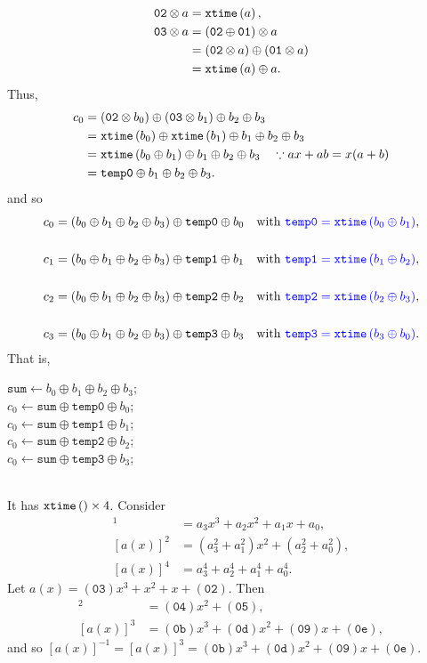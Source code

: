 \begin{align*}
	\texttt{02}\otimes a&=\texttt{xtime}\left(a\right), \\
	\texttt{03}\otimes a&=(\texttt{02}\oplus \texttt{01})\otimes a\\
	&=(\texttt{02}\otimes a)\oplus(\texttt{01}\otimes a) \\
	&=\texttt{xtime}\left(a\right)\oplus a.
\end{align*} Thus, \begin{align*}
c_0&=(\texttt{02}\otimes b_0)\oplus(\texttt{03}\otimes b_1)\oplus b_2\oplus b_3\\
&=\texttt{xtime}\left(b_0\right)\oplus\texttt{xtime}\left(b_1\right)\oplus b_1\oplus b_2\oplus b_3 \\
&=\texttt{xtime}\left(b_0\oplus b_1\right)\oplus b_1\oplus b_2\oplus b_3\quad\because ax+ab=x(a+b) \\
&=\texttt{temp0}\oplus b_1\oplus b_2\oplus b_3.
\end{align*} and so \begin{align*}
c_0&=(b_0\oplus b_1\oplus b_2\oplus b_3)\oplus\texttt{temp0}\oplus b_0 &\text{with}\ \textcolor{blue}{\texttt{temp0} = \texttt{xtime}\left(b_0\oplus b_1\right)},\\ \\
c_1&=(b_0\oplus b_1\oplus b_2\oplus b_3)\oplus\texttt{temp1}\oplus b_1 &\text{with}\ \textcolor{blue}{\texttt{temp1} = \texttt{xtime}\left(b_1\oplus b_2\right)},\\ \\
c_2&=(b_0\oplus b_1\oplus b_2\oplus b_3)\oplus\texttt{temp2}\oplus b_2 &\text{with}\ \textcolor{blue}{\texttt{temp2} = \texttt{xtime}\left(b_2\oplus b_3\right)},\\ \\
c_3&=(b_0\oplus b_1\oplus b_2\oplus b_3)\oplus\texttt{temp3}\oplus b_3 &\text{with}\ \textcolor{blue}{\texttt{temp3} = \texttt{xtime}\left(b_3\oplus b_0\right)}.
\end{align*} That is, \begin{algorithm}
$\texttt{sum}\gets b_0\oplus b_1\oplus b_2\oplus b_3$; \\
$c_0\gets\texttt{sum}\oplus\texttt{temp0}\oplus b_0$; \\
$c_0\gets\texttt{sum}\oplus\texttt{temp1}\oplus b_1$; \\
$c_0\gets\texttt{sum}\oplus\texttt{temp2}\oplus b_2$; \\
$c_0\gets\texttt{sum}\oplus\texttt{temp3}\oplus b_3$; \\
\end{algorithm}\\ It has $\texttt{xtime}\left(\right)\times 4$.
Consider \begin{align*}
	[a(x)]^1&=a_3x^3+a_2x^2+a_1x+a_0,\\
	[a(x)]^2&=(a_3^2+a_1^2)x^2+(a_2^2+a_0^2),\\
	[a(x)]^4&=a_3^4+a_2^4+a_1^4+a_0^4.
\end{align*}
Let $a(x)=(\texttt{03})x^3+x^2+x+(\texttt{02})$. Then \begin{align*}
	[a(x)]^2&=(\texttt{04})x^2+(\texttt{05}),\\
	[a(x)]^3&=(\texttt{0b})x^3+(\texttt{0d})x^2+(\texttt{09})x+(\texttt{0e}),
\end{align*} and so $[a(x)]^{-1}=[a(x)]^3=(\texttt{0b})x^3+(\texttt{0d})x^2+(\texttt{09})x+(\texttt{0e})$.

